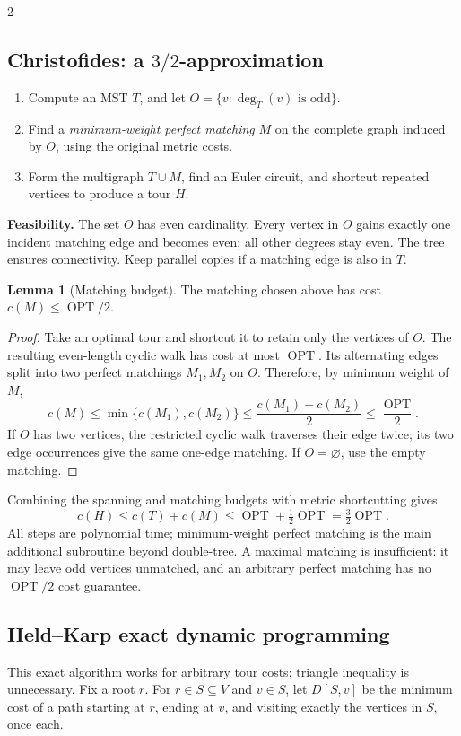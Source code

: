 \documentclass[8pt]{extarticle}
\theoremstyle{definition}
\newtheorem{lemma}[definition]{Lemma}
\newcommand{\OPT}{\operatorname{OPT}}
\begin{document}
\begin{multicols*}{2}
\subsection{Christofides: a \texorpdfstring{$3/2$}{3/2}-approximation}\label{tsp:christofides}
\begin{enumerate}
  \item Compute an MST $T$, and let $O=\{v:\deg_T(v)\text{ is odd}\}$.
  \item Find a \emph{minimum-weight perfect matching} $M$ on the complete
        graph induced by $O$, using the original metric costs.
  \item Form the multigraph $T\cup M$, find an Euler circuit, and shortcut
        repeated vertices to produce a tour $H$.
\end{enumerate}
\textbf{Feasibility.} The set $O$ has even cardinality.  Every vertex in
$O$ gains exactly one incident matching edge and becomes even; all other
degrees stay even.  The tree ensures connectivity.  Keep parallel copies
if a matching edge is also in $T$.

\begin{lemma}[Matching budget]
The matching chosen above has cost $c(M)\le\OPT/2$.
\end{lemma}
\begin{proof}
Take an optimal tour and shortcut it to retain only the vertices of $O$.
The resulting even-length cyclic walk has cost at most $\OPT$.  Its
alternating edges split into two perfect matchings $M_1,M_2$ on $O$.
Therefore, by minimum weight of $M$,
\[
c(M)\le\min\{c(M_1),c(M_2)\}
\le\frac{c(M_1)+c(M_2)}2\le\frac{\OPT}2.
\]
If $O$ has two vertices, the restricted cyclic walk traverses their edge
twice; its two edge occurrences give the same one-edge matching.  If
$O=\varnothing$, use the empty matching.
\end{proof}
Combining the spanning and matching budgets with metric shortcutting gives
\[
\boxed{\ c(H)\le c(T)+c(M)\le\OPT+\tfrac12\OPT
       =\tfrac32\OPT.\ }
\]
All steps are polynomial time; minimum-weight perfect matching is the main
additional subroutine beyond double-tree.  A maximal matching is insufficient:
it may leave odd vertices unmatched, and an arbitrary perfect matching has
no $\OPT/2$ cost guarantee.

\subsection{Held--Karp exact dynamic programming}\label{tsp:heldkarp}
This exact algorithm works for arbitrary tour costs; triangle inequality
is unnecessary.  Fix a root $r$.  For $r\in S\subseteq V$ and $v\in S$,
let $D[S,v]$ be the minimum cost of a path starting at $r$, ending at $v$,
and visiting exactly the vertices in $S$, once each.


\end{multicols*}
\end{document}
